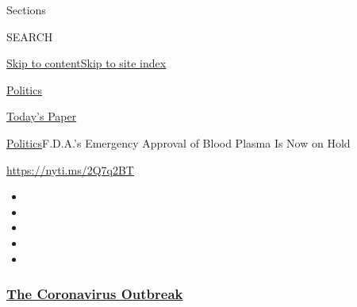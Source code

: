Sections

SEARCH

\protect\hyperlink{site-content}{Skip to
content}\protect\hyperlink{site-index}{Skip to site index}

\href{https://www.nytimes3xbfgragh.onion/section/politics}{Politics}

\href{https://myaccount.nytimes3xbfgragh.onion/auth/login?response_type=cookie\&client_id=vi}{}

\href{https://www.nytimes3xbfgragh.onion/section/todayspaper}{Today's
Paper}

\href{/section/politics}{Politics}\textbar{}F.D.A.'s Emergency Approval
of Blood Plasma Is Now on Hold

\url{https://nyti.ms/2Q7q2BT}

\begin{itemize}
\item
\item
\item
\item
\item
\end{itemize}

\hypertarget{the-coronavirus-outbreak}{%
\subsubsection{\texorpdfstring{\href{https://www.nytimes3xbfgragh.onion/news-event/coronavirus?name=styln-coronavirus-national\&region=TOP_BANNER\&block=storyline_menu_recirc\&action=click\&pgtype=Article\&impression_id=45479000-f52e-11ea-a92a-d1075f6219dd\&variant=undefined}{The
Coronavirus
Outbreak}}{The Coronavirus Outbreak}}\label{the-coronavirus-outbreak}}

